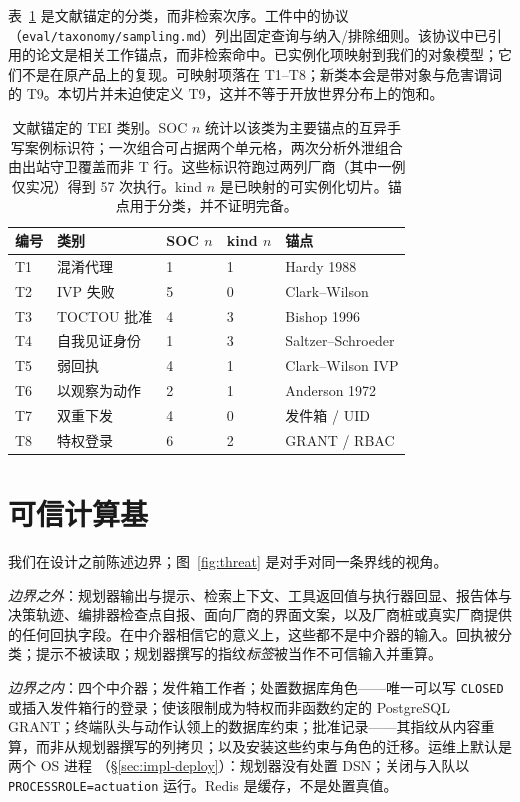 \documentclass[acmsmall,manuscript,review,anonymous]{acmart}
\renewcommand{\_}{\discretionary{\textunderscore}{}{\textunderscore}}
\begin{document}
表~\ref{tab:taxonomy} 是文献锚定的分类，而非检索次序。工件中的协议
（\texttt{eval/taxonomy/sampling.md}）列出固定查询与纳入/排除细则。该协议中已引用的论文是相关工作锚点，而非检索命中。已实例化项映射到我们的对象模型；它们不是在原产品上的复现。可映射项落在 T1--T8；新类本会是带对象与危害谓词的 T9。本切片并未迫使定义 T9，这并不等于开放世界分布上的饱和。

\begin{table}[t]
\centering
\scriptsize
\caption{文献锚定的 TEI 类别。SOC $n$ 统计以该类为主要锚点的互异手写案例标识符；一次组合可占据两个单元格，两次分析外泄组合由出站守卫覆盖而非 T 行。这些标识符跑过两列厂商（其中一例仅实况）得到 57 次执行。kind $n$ 是已映射的可实例化切片。锚点用于分类，并不证明完备。}
\label{tab:taxonomy}
\begin{tabular}{@{}lllll@{}}
\hline
编号 & 类别 & SOC $n$ & kind $n$ & 锚点 \\
\hline
T1 & 混淆代理 & 1 & 1 & Hardy 1988 \\
T2 & {IVP} 失败 & 5 & 0 & Clark--Wilson \\
T3 & TOCTOU 批准 & 4 & 3 & Bishop 1996 \\
T4 & 自我见证身份 & 1 & 3 & Saltzer--Schroeder \\
T5 & 弱回执 & 4 & 1 & Clark--Wilson {IVP} \\
T6 & 以观察为动作 & 2 & 1 & Anderson 1972 \\
T7 & 双重下发 & 4 & 0 & 发件箱 / UID \\
T8 & 特权登录 & 6 & 2 & GRANT / RBAC \\
\hline
\end{tabular}
\end{table}

\section{可信计算基}
\label{sec:tcb}

我们在设计之前陈述边界；图~\ref{fig:threat} 是对手对同一条界线的视角。

\emph{边界之外}：规划器输出与提示、检索上下文、工具返回值与执行器回显、报告体与决策轨迹、编排器检查点自报、面向厂商的界面文案，以及厂商桩或真实厂商提供的任何回执字段。在中介器相信它的意义上，这些都不是中介器的输入。回执被分类；提示不被读取；规划器撰写的指纹\emph{标签}被当作不可信输入并重算。

\emph{边界之内}：四个中介器；发件箱工作者；处置数据库角色——唯一可以写 \texttt{CLOSED} 或插入发件箱行的登录；使该限制成为特权而非函数约定的 {PostgreSQL} {GRANT}；终端队头与动作认领上的数据库约束；批准记录——其指纹从内容重算，而非从规划器撰写的列拷贝；以及安装这些约束与角色的迁移。运维上默认是两个 {OS} 进程
（\S\ref{sec:impl-deploy}）：规划器没有处置 {DSN}；关闭与入队以 \texttt{PROCESS\_ROLE=actuation} 运行。Redis 是缓存，不是处置真值。
\end{document}
